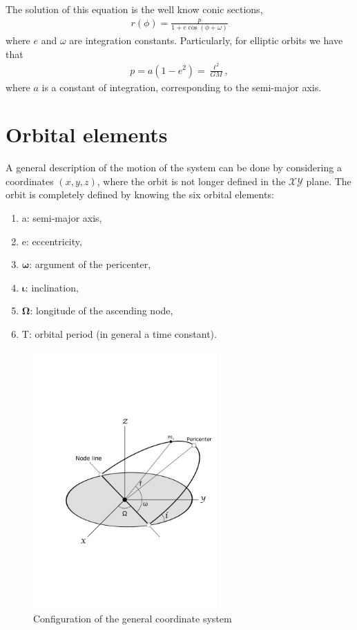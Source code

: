 The solution of this equation is the well know conic sections,
\begin{align}
r (\phi) = \frac{p}{1+e\cos(\phi+\omega)}
\end{align}
where $e$ and $\omega$ are integration constants. Particularly, for elliptic orbits we have that \begin{align}
p = a(1-e^2) = \frac{\ell^2}{GM},
\end{align}
where $a$ is a constant of integration, corresponding to the semi-major axis.

\section{Orbital elements}
A general description of the motion of the system can be done by considering a coordinates $(x,y,z)$, where the orbit is not longer defined in the $\mathcal{X}\mathcal{Y}$ plane. The orbit is completely defined by knowing the six orbital elements:
\begin{enumerate}\bfseries
\color{forestgreen}
\item  a: semi-major axis,
\item e: eccentricity,
\item $\boldsymbol{\omega}$: argument of the pericenter,
\item $\boldsymbol{\iota}$: inclination,
\item $\boldsymbol{\Omega}$: longitude of the ascending node,
\item T: orbital period (in general a time constant).
\end{enumerate}

\begin{figure}[htb!]
\centering
\includegraphics[width=7cm]{../Tesis/Capitulo2/Figures/elementosorbitales.pdf}
\caption{Configuration of the general coordinate system}
\label{fig: orbitalelementsdibujo}
\end{figure}

